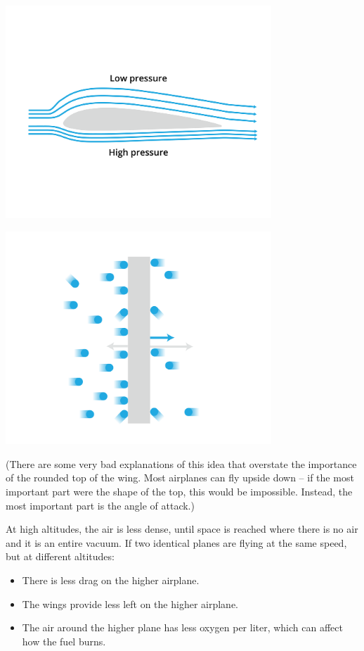 \begin{center}
    \includegraphics[width=0.75\textwidth]{airfoil.png}
    
\end{center}
\begin{center}
    \includegraphics[width=0.75\textwidth]{pressureMicro.png}
    
\end{center}
(There are some very bad explanations of this idea that overstate the importance of the rounded top of the wing.   Most airplanes can fly upside down -- if the 
most important part were the shape of the top,  this would be impossible. Instead, the most important part is the angle of attack.)


At high altitudes, the air is less dense, until space is reached where there is no air and it is an entire vacuum. If two identical planes are flying  at the same speed,  but at different altitudes: 
\begin{itemize}
\item There is less drag on the higher airplane.
\item The wings provide less left on the higher airplane.
\item The air around the higher plane has less oxygen per liter, which can affect how the fuel burns.
\end{itemize}

